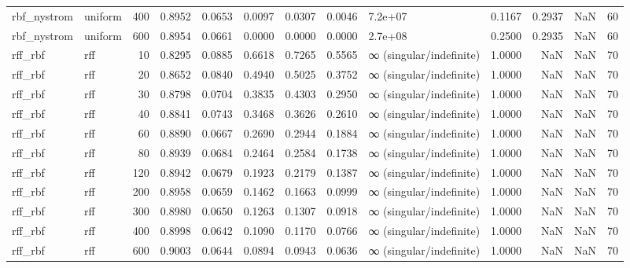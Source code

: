 \begin{table}
\begin{tabular}{llrrrrrrlrrrr}
rbf\_nystrom & uniform & 400 & 0.8952 & 0.0653 & 0.0097 & 0.0307 & 0.0046 & 7.2e+07 & 0.1167 & 0.2937 & NaN & 60 \\
rbf\_nystrom & uniform & 600 & 0.8954 & 0.0661 & 0.0000 & 0.0000 & 0.0000 & 2.7e+08 & 0.2500 & 0.2935 & NaN & 60 \\
rff\_rbf & rff & 10 & 0.8295 & 0.0885 & 0.6618 & 0.7265 & 0.5565 & ∞ (singular/indefinite) & 1.0000 & NaN & NaN & 70 \\
rff\_rbf & rff & 20 & 0.8652 & 0.0840 & 0.4940 & 0.5025 & 0.3752 & ∞ (singular/indefinite) & 1.0000 & NaN & NaN & 70 \\
rff\_rbf & rff & 30 & 0.8798 & 0.0704 & 0.3835 & 0.4303 & 0.2950 & ∞ (singular/indefinite) & 1.0000 & NaN & NaN & 70 \\
rff\_rbf & rff & 40 & 0.8841 & 0.0743 & 0.3468 & 0.3626 & 0.2610 & ∞ (singular/indefinite) & 1.0000 & NaN & NaN & 70 \\
rff\_rbf & rff & 60 & 0.8890 & 0.0667 & 0.2690 & 0.2944 & 0.1884 & ∞ (singular/indefinite) & 1.0000 & NaN & NaN & 70 \\
rff\_rbf & rff & 80 & 0.8939 & 0.0684 & 0.2464 & 0.2584 & 0.1738 & ∞ (singular/indefinite) & 1.0000 & NaN & NaN & 70 \\
rff\_rbf & rff & 120 & 0.8942 & 0.0679 & 0.1923 & 0.2179 & 0.1387 & ∞ (singular/indefinite) & 1.0000 & NaN & NaN & 70 \\
rff\_rbf & rff & 200 & 0.8958 & 0.0659 & 0.1462 & 0.1663 & 0.0999 & ∞ (singular/indefinite) & 1.0000 & NaN & NaN & 70 \\
rff\_rbf & rff & 300 & 0.8980 & 0.0650 & 0.1263 & 0.1307 & 0.0918 & ∞ (singular/indefinite) & 1.0000 & NaN & NaN & 70 \\
rff\_rbf & rff & 400 & 0.8998 & 0.0642 & 0.1090 & 0.1170 & 0.0766 & ∞ (singular/indefinite) & 1.0000 & NaN & NaN & 70 \\
rff\_rbf & rff & 600 & 0.9003 & 0.0644 & 0.0894 & 0.0943 & 0.0636 & ∞ (singular/indefinite) & 1.0000 & NaN & NaN & 70 \\
\bottomrule
\end{tabular}
\end{table}
